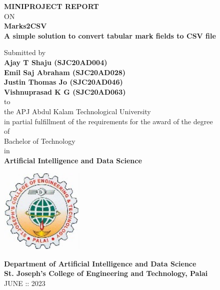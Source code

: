 \thispagestyle{empty}
\begin{center}
 
{\Large \bf MINIPROJECT REPORT}\\
ON\\
{\large \bf Marks2CSV\\ A simple solution to convert tabular mark fields to CSV file}

   \vspace*{1 cm}
   {\large Submitted by\\
   { \bf Ajay T Shaju (SJC20AD004)}\\
   { \bf Emil Saj Abraham (SJC20AD028)}\\
   { \bf Justin Thomas Jo (SJC20AD046)}\\
   { \bf Vishnuprasad K G (SJC20AD063)}}\\[-0.6mm]
  {\large to\\[-0.6mm] the APJ Abdul Kalam Technological University\\[-0.6mm] in partial fulfillment of the requirements for the award of the degree\\[-0.6mm] of\\[-0.6mm] Bachelor of Technology\\[-0.6mm] in\\[-0.6mm] {\bf Artificial Intelligence and Data Science}}
  
   \begin{center}
   \includegraphics[width=0.3\textwidth]{Images/SJCET_logo.jpg}
   \end{center}
   \vspace*{-0.5cm}
  {\LARGE {\bf Department of Artificial Intelligence and Data Science}}\\
          [-3mm] {\large {\bf St. Joseph's College of Engineering and Technology, Palai}\\
           [1mm] JUNE :: 2023}

\end{center}
